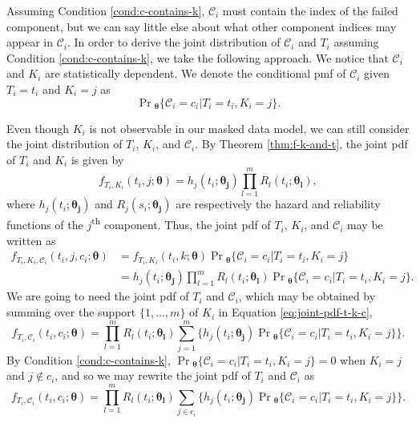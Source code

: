 \documentclass[
]{article}
\theoremstyle{definition}
\theoremstyle{plain}
\theoremstyle{definition}
\theoremstyle{definition}
\theoremstyle{definition}
\theoremstyle{definition}
\theoremstyle{remark}
\begin{document}
Assuming Condition \ref{cond:c-contains-k}, \(\mathcal{C}_i\) must contain the
index of the failed component, but we can say little else about what other
component indices may appear in \(\mathcal{C}_i\).
In order to derive the joint distribution of \(\mathcal{C}_i\) and \(T_i\) assuming
Condition \ref{cond:c-contains-k}, we take the following approach.
We notice that \(\mathcal{C}_i\) and \(K_i\) are statistically dependent.
We denote the conditional pmf of \(\mathcal{C}_i\) given \(T_i = t_i\) and
\(K_i = j\) as
\[
\Pr{}_{\!\boldsymbol{\theta}}\{\mathcal{C}_i = c_i | T_i = t_i, K_i = j\}.
\]

Even though \(K_i\) is not observable in our masked data model, we can still
consider the joint distribution of \(T_i\), \(K_i\), and \(\mathcal{C}_i\).
By Theorem \ref{thm:f-k-and-t}, the joint pdf of \(T_i\) and \(K_i\) is given by
\[
f_{T_i,K_i}(t_i,j;\boldsymbol{\theta}) = h_j(t_i;\boldsymbol{\theta_j}) \prod_{l=1}^m R_l(t_i;\boldsymbol{\theta_l}),
\]
where \(h_j(t_i;\boldsymbol{\theta_j})\) and \(R_j(s_i;\boldsymbol{\theta_j})\) are respectively the hazard
and reliability functions of the \(j\)\textsuperscript{th} component.
Thus, the joint pdf of \(T_i\), \(K_i\), and \(\mathcal{C}_i\) may be written as
\begin{equation}
\label{eq:joint-pdf-t-k-c}
\begin{split}
f_{T_i,K_i,\mathcal{C}_i}(t_i,j,c_i;\boldsymbol{\theta})
    &= f_{T_i,K_i}(t_i,k;\boldsymbol{\theta}) \Pr{}_{\!\boldsymbol{\theta}}\{\mathcal{C}_i=c_i|T_i=t_i,K_i=j\}\\
    &= h_j(t_i;\boldsymbol{\theta_j}) \prod_{l=1}^m R_l(t_i;\boldsymbol{\theta_l})
    \Pr{}_{\!\boldsymbol{\theta}}\{\mathcal{C}_i=c_i|T_i=t_i,K_i=j\}.
\end{split}
\end{equation}
We are going to need the joint pdf of \(T_i\) and \(\mathcal{C}_i\), which
may be obtained by summing over the support \(\{1,\ldots,m\}\) of \(K_i\) in
Equation \eqref{eq:joint-pdf-t-k-c},
\[
f_{T_i,\mathcal{C}_i}(t_i,c_i;\boldsymbol{\theta}) = \prod_{l=1}^m R_l(t_i;\boldsymbol{\theta_l})
    \sum_{j=1}^m \biggl\{
        h_j(t_i;\boldsymbol{\theta_j}) \Pr{}_{\!\boldsymbol{\theta}}\{\mathcal{C}_i=c_i|T_i=t_i,K_i=j\}
    \biggr\}.
\]
By Condition \ref{cond:c-contains-k},
\(\Pr{}_{\!\boldsymbol{\theta}}\{\mathcal{C}_i=c_i|T_i=t_i,K_i=j\} = 0\) when \(K_i = j\) and
\(j \notin c_i\), and so we may rewrite the joint pdf of \(T_i\) and
\(\mathcal{C}_i\) as
\begin{equation}
\label{eq:part1}
f_{T_i,\mathcal{C}_i}(t_i,c_i;\boldsymbol{\theta}) = \prod_{l=1}^m R_l(t_i;\boldsymbol{\theta_l})
    \sum_{j \in c_i} \biggl\{
        h_j(t_i;\boldsymbol{\theta_j}) \Pr{}_{\!\boldsymbol{\theta}}\{\mathcal{C}_i=c_i|T_i=t_i,K_i=j\}
    \biggr\}.
\end{equation}
\end{document}
